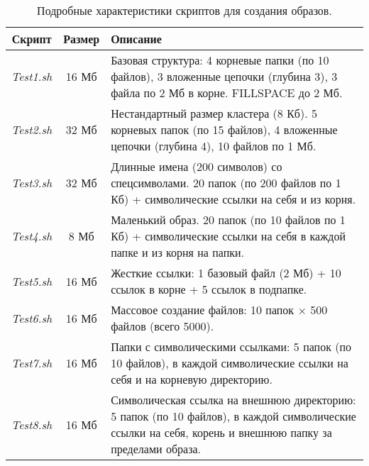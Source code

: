 \begin{table}[htbp]
	\renewcommand{\arraystretch}{1.5}
	\centering
	\begin{tabular}{|c|c|p{10cm}|}
		\hline
		\textbf{Скрипт} & \textbf{Размер} & \textbf{Описание} \\
		\hline
		\textit{Test1.sh} & 16 Мб & Базовая структура: 4 корневые папки (по 10 файлов), 3 вложенные цепочки (глубина 3), 3 файла по 2 Мб в корне. FILLSPACE до 2 Мб. \\
		\hline
		\textit{Test2.sh} & 32 Мб & Нестандартный размер кластера (8 Кб). 5 корневых папок (по 15 файлов), 4 вложенные цепочки (глубина 4), 10 файлов по 1 Мб.\\
		\hline
		\textit{Test3.sh} & 32 Мб &Длинные имена (200 символов) со спецсимволами. 20 папок (по 200 файлов по 1 Кб) + символические ссылки на себя и из корня. \\
		\hline
		\textit{Test4.sh} & 8 Мб & Маленький образ. 20 папок (по 10 файлов по 1 Кб) + символические ссылки на себя в каждой папке и из корня на папки.\\
		\hline
		\textit{Test5.sh} & 16 Мб & Жесткие ссылки: 1 базовый файл (2 Мб) + 10 ссылок в корне + 5 ссылок в подпапке.\\
		\hline
		\textit{Test6.sh} & 16 Мб & Массовое создание файлов: 10 папок × 500 файлов (всего 5000). \\
		\hline
		\textit{Test7.sh} & 16 Мб & Папки с символическими ссылками: 5 папок (по 10 файлов), в каждой символические ссылки на себя и на корневую директорию.\\
		\hline
		\textit{Test8.sh} & 16 Мб & Символическая ссылка на внешнюю директорию: 5 папок (по 10 файлов), в каждой символические ссылки на себя, корень и внешнюю папку за пределами образа.\\
		\hline
	\end{tabular}
		\caption{Подробные характеристики скриптов для создания образов.}
	\label{ntfs:tab:test_detail}
\end{table}

\newpage
